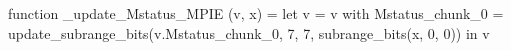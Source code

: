 function _update_Mstatus_MPIE (v, x) = let v = { v with Mstatus_chunk_0 = update_subrange_bits(v.Mstatus_chunk_0, 7, 7, subrange_bits(x, 0, 0)) } in
  v
